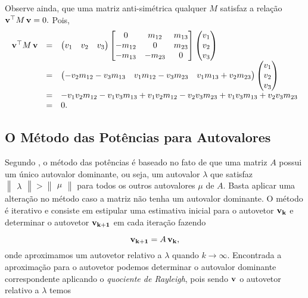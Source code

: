 Observe ainda, que uma matriz anti-simétrica qualquer $M$ satisfaz a relação ${\bf v}^\top M\,{\bf v}=0.$ Pois,
\begin{equation*}
\begin{array}{rcl}
{\bf v}^\top M\,{\bf v}
&=&
\begin{pmatrix}
v_1&v_2&v_3
\end{pmatrix}
\begin{bmatrix}
0&m_{12}&m_{13}\\
-m_{12}&0&m_{23}\\
-m_{13}&-m_{23}&0
\end{bmatrix}
\begin{pmatrix}
v_1\\
v_2\\
v_3
\end{pmatrix}\\
&=&
\begin{pmatrix}
-v_2 m_{12}-v_3 m_{13}&v_1 m_{12}-v_3 m_{23}&v_1 m_{13}+v_2 m_{23}
\end{pmatrix}
\begin{pmatrix}
v_1\\
v_2\\
v_3
\end{pmatrix}\\
&=&
-v_1 v_2 m_{12}-v_1 v_3 m_{13}+v_1 v_2 m_{12}-v_2 v_3 m_{23}+v_1 v_3 m_{13}+v_2 v_3 m_{23}\\
&=&0.
\end{array}
\end{equation*}

\subsection{O Método das Potências para Autovalores}\label{sec.potencias-autovalores}
Segundo \citep{cox-using}, o método das potências é baseado no fato de que uma matriz $A$ possui um único autovalor dominante, ou seja, um autovalor $\lambda$ que satisfaz $\begin{Vmatrix}\lambda\end{Vmatrix} > \begin{Vmatrix}\mu\end{Vmatrix}$ para todos os outros autovalores $\mu$ de $A$. Basta aplicar uma alteração no método caso a matriz não tenha um autovalor dominante. O método é iterativo e consiste em estipular uma estimativa inicial para o autovetor ${\bf v_k}$ e determinar o autovetor ${\bf v_{k+1}}$ em cada iteração fazendo

\begin{equation*}
{\bf v_{k+1}}=A\,{\bf v_k},
\end{equation*}
onde aproximamos um autovetor relativo a $\lambda$ quando $k\rightarrow \infty$. Encontrada a aproximação para o autovetor podemos determinar o autovalor dominante correspondente aplicando o \textit{quociente de Rayleigh}, pois sendo ${\bf v}$ o autovetor relativo a $\lambda$ temos

